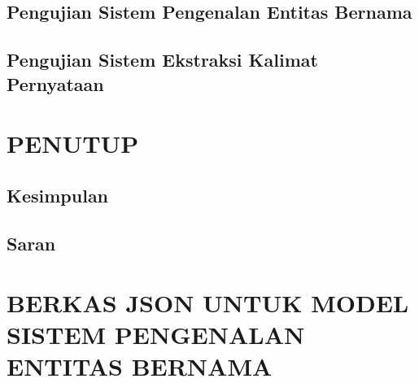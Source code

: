 \documentclass[ugmtesis]{ugmtesis}
\begin{document}
	\section{Pengujian Sistem Pengenalan Entitas Bernama}
	\label{pengujian sistem ner}
	

	\section{Pengujian Sistem Ekstraksi Kalimat Pernyataan}
	\label{pengujian sistem ekstraksi kalimat pernyataan}
	



\chapter{PENUTUP}
\label{PENUTUP}

	\section{Kesimpulan}
	\label{penutup kesimpulan}
	

	\section{Saran}
	\label{penutup saran}
	





\appendix

\chapter{BERKAS JSON UNTUK MODEL SISTEM PENGENALAN ENTITAS BERNAMA}
\label{BERKAS JSON UNTUK MODEL SISTEM PENGENALAN ENTITAS BERNAMA}


\end{document}
